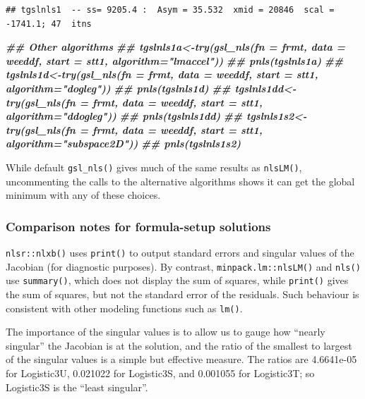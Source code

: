 \documentclass[
]{article}
\newenvironment{Shaded}{\begin{snugshade}}{\end{snugshade}}
\newcommand{\DocumentationTok}[1]{\textcolor[rgb]{0.56,0.35,0.01}{\textbf{\textit{#1}}}}
\begin{document}
\begin{verbatim}
## tgslnls1  -- ss= 9205.4 :  Asym = 35.532  xmid = 20846  scal = -1741.1; 47  itns
\end{verbatim}

\begin{Shaded}
\begin{Highlighting}[]
\DocumentationTok{\#\# Other algorithms}
\DocumentationTok{\#\# tgslnls1a\textless{}{-}try(gsl\_nls(fn = frmt, data = weeddf,  start = stt1, algorithm="lmaccel"))}
\DocumentationTok{\#\# pnls(tgslnls1a) }
\DocumentationTok{\#\# tgslnls1d\textless{}{-}try(gsl\_nls(fn = frmt, data = weeddf,  start = stt1, algorithm="dogleg"))}
\DocumentationTok{\#\# pnls(tgslnls1d) }
\DocumentationTok{\#\# tgslnls1dd\textless{}{-}try(gsl\_nls(fn = frmt, data = weeddf,  start = stt1, algorithm="ddogleg"))}
\DocumentationTok{\#\# pnls(tgslnls1dd) }
\DocumentationTok{\#\# tgslnls1s2\textless{}{-}try(gsl\_nls(fn = frmt, data = weeddf,  start = stt1, algorithm="subspace2D"))}
\DocumentationTok{\#\# pnls(tgslnls1s2) }
\end{Highlighting}
\end{Shaded}

While default \texttt{gsl\_nls()} gives much of the same results as
\texttt{nlsLM()}, uncommenting the calls to the alternative algorithms
shows it can get the global minimum with any of these choices.

\hypertarget{comparison-notes-for-formula-setup-solutions}{%
\subsubsection{Comparison notes for formula-setup
solutions}\label{comparison-notes-for-formula-setup-solutions}}

\texttt{nlsr::nlxb()} uses \texttt{print()} to output standard errors
and singular values of the Jacobian (for diagnostic purposes). By
contrast, \texttt{minpack.lm::nlsLM()} and \texttt{nls()} use
\texttt{summary()}, which does not display the sum of squares, while
\texttt{print()} gives the sum of squares, but not the standard error of
the residuals. Such behaviour is consistent with other modeling
functions such as \texttt{lm()}.

The importance of the singular values is to allow us to gauge how
``nearly singular'' the Jacobian is at the solution, and the ratio of
the smallest to largest of the singular values is a simple but effective
measure. The ratios are 4.6641e-05 for Logistic3U, 0.021022 for
Logistic3S, and 0.001055 for Logistic3T; so Logistic3S is the ``least
singular''.
\end{document}

